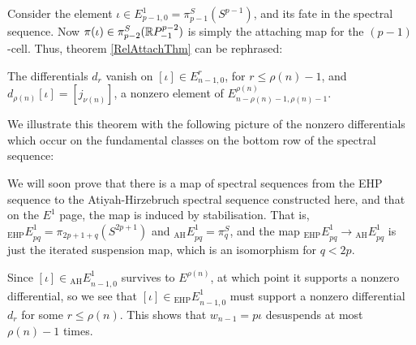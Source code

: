 Consider the element $\iota\in E^1_{p-1,0}=\pi^S_{p-1}(S^{p-1})$, and its fate in the spectral sequence. Now $\pi(\iota)\in \pi^S_{p-2}(\mathbb{R} P^{p-2}_{-1})$ is simply the attaching map for the $(p-1)$-cell. Thus, theorem \ref{RelAttachThm} can be rephrased:
\begin{thm}
The differentials $d_r$ vanish on $[\iota]\in E_{n-1,0}^r$, for $r\leq\rho(n)-1$, and $d_{\rho(n)}[\iota]=[j_{\nu(n)}]$, a nonzero element of $E^{\rho(n)}_{n-\rho(n)-1,\rho(n)-1}$.
\end{thm}
We illustrate this theorem with the following picture of the nonzero differentials which occur on the fundamental classes on the bottom row of the spectral sequence:
\begin{center}
\end{center}

We will soon prove that there is a map of spectral sequences from the EHP sequence to the Atiyah-Hirzebruch spectral sequence constructed here, and that on the $E^1$ page, the map is induced by stabilisation. That is, ${_\text{EHP}E}^1_{pq}=\pi_{2p+1+q}(S^{2p+1})$ and ${_\text{AH}E}^1_{pq}=\pi^S_q$, and the map ${_\text{EHP}E}^1_{pq}\to{_\text{AH}E}^1_{pq}$ is just the iterated suspension map, which is an isomorphism for $q<2p$.

Since $[\iota]\in {_\text{AH}E}^1_{n-1,0}$ survives to $E^{\rho(n)}$, at which point it supports a nonzero differential, so we see that $[\iota]\in {_\text{EHP}E}^1_{n-1,0}$ must support a nonzero differential $d_r$ for some $r\leq\rho(n)$. This shows that $w_{n-1}=p\iota$ desuspends at most $\rho(n)-1$ times.

